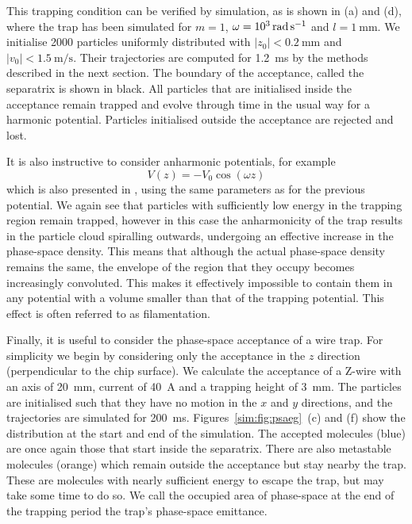 
This trapping condition can be verified by simulation, as is shown in
 (a) and (d), where the trap has been simulated for
$m = 1$, $\omega = \SI[parse-numbers=false]{10^3}{\radian\per\second}$ and $l
=\SI{1}{\milli\meter}$. We initialise 2000 particles uniformly distributed with
$|z_0| < \SI{0.2}{\milli\meter}$ and $|v_0|< \SI{1.5}{\meter\per\second}$.
Their trajectories are computed for \SI{1.2}{\milli\second} by the methods
described in the next section. The boundary of the acceptance, called the
separatrix is shown in black. All particles that are initialised inside the
acceptance remain trapped and evolve through time in the usual way for a
harmonic potential.  Particles initialised outside the acceptance are rejected
and lost.

It is also instructive to consider anharmonic potentials, for example
%
\begin{equation}
  V(z) = -V_0\cos(\omega z)
\end{equation}
%
which is also presented in , using the same
parameters as for the previous potential. We again see that particles with
sufficiently low energy in the trapping region remain trapped, however in this
case the anharmonicity of the trap results in the particle cloud spiralling
outwards, undergoing an effective increase in the phase-space density. This
means that although the actual phase-space density remains the same, the
envelope of the region that they occupy becomes increasingly convoluted. This
makes it effectively impossible to contain them in any potential with a volume
smaller than that of the trapping potential. This effect is often referred to
as filamentation.

Finally, it is useful to consider the phase-space acceptance of a wire trap.
For simplicity we begin by considering only the acceptance in the $z$ direction
(perpendicular to the chip surface). We calculate the acceptance of a Z-wire
with an axis of \SI{20}{\milli\meter}, current of \SI{40}{\ampere} and a
trapping height of \SI{3}{\milli\meter}. The particles are initialised such
that they have no motion in the $x$ and $y$ directions, and the trajectories
are simulated for \SI{200}{\milli\second}. Figures~\ref{sim:fig:psaeg}~(c)
and (f) show the distribution at the start and end of the simulation.
The accepted molecules (blue) are once again those that start inside the
separatrix. There are also metastable molecules (orange) which remain outside
the acceptance but stay nearby the trap. These are molecules with nearly
sufficient energy to escape the trap, but may take some time to do so.
We call the occupied area of phase-space at the end of the trapping
period the trap's phase-space emittance.

